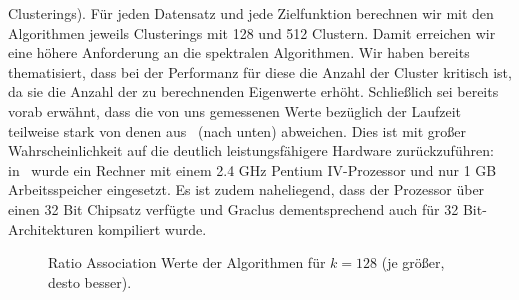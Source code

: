 Clusterings). Für jeden Datensatz und jede Zielfunktion berechnen wir mit den Algorithmen jeweils Clusterings mit 128
und 512 Clustern. Damit erreichen wir eine höhere Anforderung an die spektralen Algorithmen. Wir haben bereits thematisiert, dass
bei der Performanz für diese die Anzahl der Cluster kritisch ist, da sie die Anzahl der zu berechnenden Eigenwerte erhöht.
Schließlich sei bereits vorab erwähnt, dass die von uns gemessenen Werte bezüglich der Laufzeit teilweise stark von denen
aus~\cite{DhillonGK07} (nach unten) abweichen. Dies ist mit großer Wahrscheinlichkeit auf die deutlich leistungsfähigere 
Hardware zurückzuführen: in~\cite{DhillonGK07} wurde ein Rechner mit einem 2.4 GHz Pentium IV-Prozessor und nur 1 GB
Arbeitsspeicher eingesetzt. Es ist zudem naheliegend, dass der Prozessor über einen 32 Bit Chipsatz verfügte und Graclus
dementsprechend auch für 32 Bit-Architekturen kompiliert wurde.

\begin{figure}[ht!]
	\centering
\caption{Ratio Association Werte der Algorithmen für $k = 128$ (je größer, desto besser).}
\label{fig:experiment-experiment-kkmpp-ratioassoc-128}
\end{figure}

